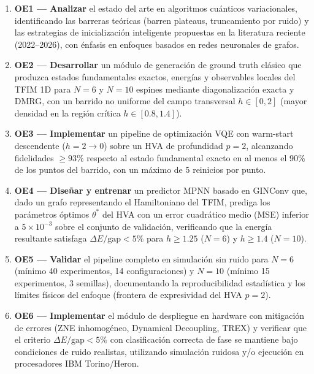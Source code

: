 \documentclass[11pt,a4paper,spanish]{book}
\begin{document}
\begin{enumerate}
    \item \textbf{OE1 --- Analizar} el estado del arte en algoritmos cuánticos variacionales, identificando las barreras teóricas (barren plateaus, truncamiento por ruido) y las estrategias de inicialización inteligente propuestas en la literatura reciente (2022--2026), con énfasis en enfoques basados en redes neuronales de grafos.

    \item \textbf{OE2 --- Desarrollar} un módulo de generación de ground truth clásico que produzca estados fundamentales exactos, energías y observables locales del TFIM 1D para $N = 6$ y $N = 10$ espines mediante diagonalización exacta y DMRG, con un barrido no uniforme del campo transversal $h \in [0, 2]$ (mayor densidad en la región crítica $h \in [0.8, 1.4]$).

    \item \textbf{OE3 --- Implementar} un pipeline de optimización VQE con warm-start descendente ($h = 2 \to 0$) sobre un HVA de profundidad $p = 2$, alcanzando fidelidades $\geq 93\%$ respecto al estado fundamental exacto en al menos el 90\% de los puntos del barrido, con un máximo de 5 reinicios por punto.

    \item \textbf{OE4 --- Diseñar y entrenar} un predictor MPNN basado en GINConv que, dado un grafo representando el Hamiltoniano del TFIM, prediga los parámetros óptimos $\theta^*$ del HVA con un error cuadrático medio (MSE) inferior a $5 \times 10^{-3}$ sobre el conjunto de validación, verificando que la energía resultante satisfaga $\Delta E/\text{gap} < 5\%$ para $h \geq 1.25$ ($N = 6$) y $h \geq 1.4$ ($N = 10$).

    \item \textbf{OE5 --- Validar} el pipeline completo en simulación sin ruido para $N = 6$ (mínimo 40 experimentos, 14 configuraciones) y $N = 10$ (mínimo 15 experimentos, 3 semillas), documentando la reproducibilidad estadística y los límites físicos del enfoque (frontera de expresividad del HVA $p = 2$).

    \item \textbf{OE6 --- Implementar} el módulo de despliegue en hardware con mitigación de errores (ZNE inhomogéneo, Dynamical Decoupling, TREX) y verificar que el criterio $\Delta E/\text{gap} < 5\%$ con clasificación correcta de fase se mantiene bajo condiciones de ruido realistas, utilizando simulación ruidosa y/o ejecución en procesadores IBM Torino/Heron.
\end{enumerate}
\end{document}
